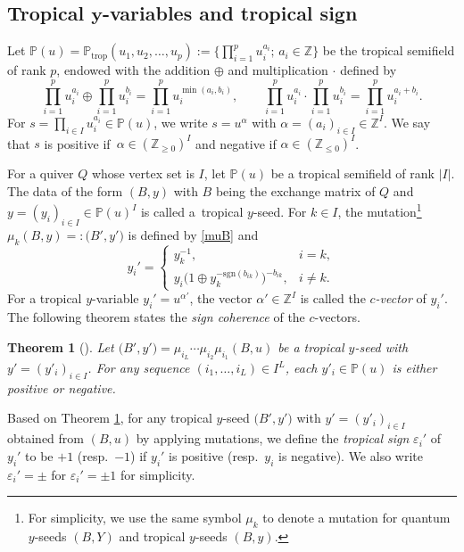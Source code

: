 \documentclass[11pt]{article}
\numberwithin{equation}{section}
\newcommand{\Z}{{\mathbb Z}}
\def\ve{{\varepsilon}}
\newcommand\trop{{\mathrm{trop}}}
\newcommand\bY{Y}
\numberwithin{equation}{section}
\newtheorem{Theorem}{Theorem}[section]
\begin{document}
\subsection[Tropical y-variables and tropical sign]{Tropical $\boldsymbol{y}$-variables and tropical sign}

Let $\mathbb{P}(u)=\mathbb{P}_\trop(u_1,u_2,\dotsc,u_p) := \bigl\{\prod_{i=1}^{p} u_i^{a_i};\, a_i \in \Z \bigr\}$
be the tropical semifield of rank $p$, endowed with the addition $\oplus$ and multiplication $\cdot$ defined by
\[
 \prod_{i=1}^{p} u_i^{a_i} \oplus \prod_{i=1}^{p} u_i^{b_i}
 =
 \prod_{i=1}^{p} u_i^{\min(a_i,b_i)},
 \qquad
 \prod_{i=1}^{p} u_i^{a_i} \cdot \prod_{i=1}^{p} u_i^{b_i}
 =
 \prod_{i=1}^{p} u_i^{a_i+b_i}.
\]
For $s = \prod_{i \in I} u_i^{a_i} \in \mathbb{P}(u)$, we write $s = u^\alpha$
with $\alpha = (a_i)_{i \in I} \in \Z^{I}$.
We say that $s$ is positive if~${\alpha \in (\Z_{\geq 0})^{I}}$ and negative if
$\alpha \in (\Z_{\leq 0})^{I}$.

For a quiver $Q$ whose vertex set is $I$, let $\mathbb{P}(u)$ be a tropical semifield of rank $|I|$.
The data of the form $(B,y)$ with $B$ being the exchange matrix of $Q$ and
$y = (y_i)_{i \in I} \in \mathbb{P}(u)^{I}$ is called a~tropical $y$-seed.
For $k \in I$, the mutation\footnote{For simplicity, we use the same symbol $\mu_k$ to denote a mutation for
quantum $y$-seeds $(B,\bY)$ and tropical $y$-seeds $(B,y)$.}
 $\mu_k (B, y) =: \bigl(B', y'\bigr)$ is defined by
\eqref{muB} and
\begin{equation}\label{tmu}
y_{i}' =
 \begin{cases}
 y_k^{-1}, & i=k,
 \\
 y_i \bigl(1 \oplus y_k^{-\mathrm{sgn}(b_{ik})}\bigr)^{-b_{ik}}, & i \neq k.
 \end{cases}
\end{equation}
For a tropical $y$-variable $y_i' = u^{\alpha'}$, the vector $\alpha' \in \Z^I$
is called the {\it $c$-vector} of $y_i'$.
The following theorem states the {\em sign coherence} of the $c$-vectors.

\begin{Theorem}[\cite{FZ07,GHKK14}]
\label{thm:sign-coherence}
Let $\bigl(B',y'\bigr) = \mu_{i_L} \dotsm \mu_{i_2} \mu_{i_1}(B,u)$ be a
tropical $y$-seed with $y'=(y'_i)_{i \in I}$. For any sequence
$(i_1,\dotsc, i_L) \in I^L$, each $y'_i \in \mathbb{P}(u)$ is either
positive or negative.
\end{Theorem}

Based on Theorem \ref{thm:sign-coherence}, for any tropical $y$-seed $\bigl(B',y'\bigr)$ with
$y'=(y'_i)_{i \in I}$ obtained from $(B,u)$ by applying mutations, we
define the {\it tropical sign} $\ve_i'$ of $y_i'$ to be $+1$ (resp.\
$-1$) if $y_i'$ is positive (resp.\ $y_i$ is negative). We also write
$\ve_i'= \pm$ for $\ve_i'=\pm 1$ for simplicity.
\end{document}
